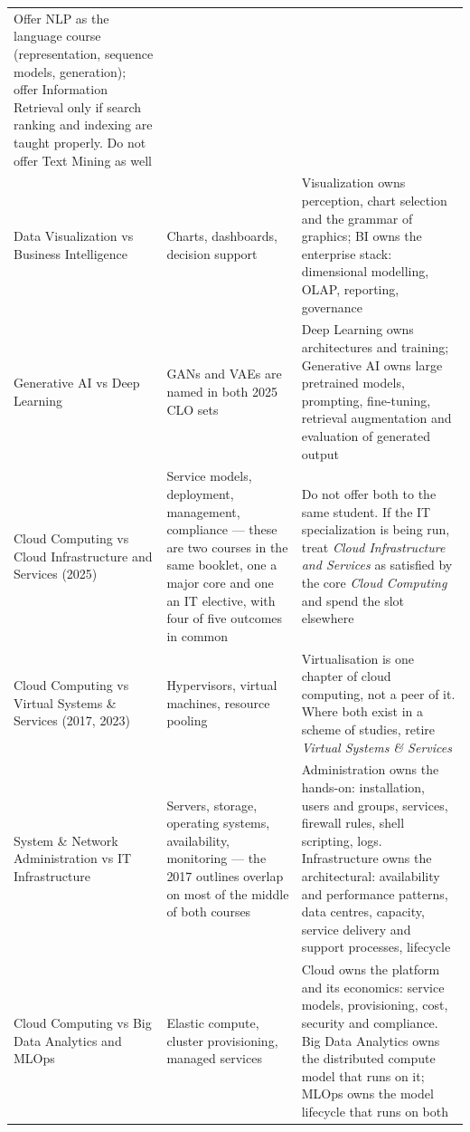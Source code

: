 \documentclass[11pt,a4paper,oneside]{report}
\begin{document}
\begin{longtable}{@{}L{4.4cm}L{5.2cm}L{6.0cm}@{}}
Offer NLP as the language course (representation, sequence models, generation);
offer Information Retrieval only if search ranking and indexing are taught
properly. Do not offer Text Mining as well \\
Data Visualization \newline vs Business Intelligence &
Charts, dashboards, decision support &
Visualization owns perception, chart selection and the grammar of graphics; BI
owns the enterprise stack: dimensional modelling, OLAP, reporting, governance \\
Generative AI vs Deep Learning &
GANs and VAEs are named in both 2025 CLO sets &
Deep Learning owns architectures and training; Generative AI owns large
pretrained models, prompting, fine-tuning, retrieval augmentation and evaluation
of generated output \\
Cloud Computing \newline vs Cloud Infrastructure and Services (2025) &
Service models, deployment, management, compliance --- these are two courses in
the same booklet, one a major core and one an IT elective, with four of five
outcomes in common &
Do not offer both to the same student. If the IT specialization is being run,
treat \emph{Cloud Infrastructure and Services} as satisfied by the core
\emph{Cloud Computing} and spend the slot elsewhere \\
Cloud Computing \newline vs Virtual Systems \& Services (2017, 2023) &
Hypervisors, virtual machines, resource pooling &
Virtualisation is one chapter of cloud computing, not a peer of it. Where both
exist in a scheme of studies, retire \emph{Virtual Systems \& Services} \\
System \& Network Administration \newline vs IT Infrastructure &
Servers, storage, operating systems, availability, monitoring --- the 2017
outlines overlap on most of the middle of both courses &
Administration owns the hands-on: installation, users and groups, services,
firewall rules, shell scripting, logs. Infrastructure owns the architectural:
availability and performance patterns, data centres, capacity, service delivery
and support processes, lifecycle \\
Cloud Computing \newline vs Big Data Analytics and MLOps &
Elastic compute, cluster provisioning, managed services &
Cloud owns the platform and its economics: service models, provisioning, cost,
security and compliance. Big Data Analytics owns the distributed compute model
that runs on it; MLOps owns the model lifecycle that runs on both \\
\bottomrule
\end{longtable}
\end{document}
